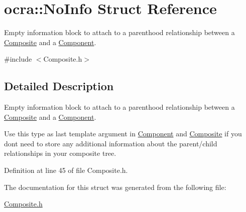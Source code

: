 \hypertarget{structocra_1_1NoInfo}{}\section{ocra\+:\+:No\+Info Struct Reference}
\label{structocra_1_1NoInfo}


Empty information block to attach to a parenthood relationship between a \hyperlink{classocra_1_1Composite}{Composite} and a \hyperlink{classocra_1_1Component}{Component}.  




{\ttfamily \#include $<$Composite.\+h$>$}



\subsection{Detailed Description}
Empty information block to attach to a parenthood relationship between a \hyperlink{classocra_1_1Composite}{Composite} and a \hyperlink{classocra_1_1Component}{Component}. 

Use this type as last template argument in \hyperlink{classocra_1_1Component}{Component} and \hyperlink{classocra_1_1Composite}{Composite} if you don\textquotesingle{}t need to store any additional information about the parent/child relationships in your composite tree. 

Definition at line 45 of file Composite.\+h.



The documentation for this struct was generated from the following file\+:\begin{DoxyCompactItemize}
\item 
\hyperlink{Composite_8h}{Composite.\+h}\end{DoxyCompactItemize}
